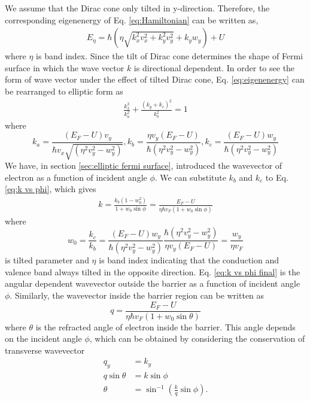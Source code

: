     We assume that the Dirac cone only tilted in y-direction. Therefore, the corresponding eigenenergy of Eq. \ref{eq:Hamiltonian} can be written as,
    \begin{align} \label{eq:eigenenergy}
        E_\eta=\hbar (\eta \sqrt{k_x^2 v_x^2+k_y^2 v_y^2 }+k_y w_y)+U
    \end{align}
    where $\eta$ is band index. Since the tilt of Dirac cone determines the shape of Fermi surface in which the wave vector $k$ is directional dependent. 
    In order to see the form of wave vector under the effect of tilted Dirac cone, Eq. \ref{eq:eigenenergy} can be rearranged to elliptic form as
    \begin{align}
        \frac{k_x^2}{k_a^2} + \frac{(k_y+k_c)^2}{k_b^2} = 1
    \end{align}
    where
    $$
    k_a = \frac{(E_F-U) v_y}{\hbar v_x \sqrt{(\eta^2 v_y^2 - w_y^2)} }, k_b = \frac{\eta v_y (E_F-U)}{\hbar (\eta^2 v_y^2 - w_y^2)},
    k_c = \frac{(E_F - U)w_y}{\hbar (\eta^2 v_y^2 - w_y^2)}
    $$
    We have, in section \ref{sec:elliptic fermi surface}, introduced the wavevector of electron as a function of incident angle $\phi$.
    We can substitute $k_b$ and $k_c$ to Eq. \ref{eq:k vs phi}, which gives
    \begin{align} \label{eq:k vs phi final}
        k = \frac{k_b(1-w_0^2)}{1+w_0 \sin{\phi}} = \frac{E_F - U}{\eta \hbar v_F (1+w_0 \sin{\phi})}
    \end{align}
    where
    \begin{equation} \label{3eq: tilted parameter}
        w_0 = \frac{k_c}{k_b} = \frac{(E_F - U)w_y}{\hbar (\eta^2 v_y^2 - w_y^2)} \frac{\hbar (\eta^2 v_y^2 - w_y^2)}{\eta v_y (E_F-U)} = \frac{w_y}{\eta v_F}
    \end{equation} 
    is tilted parameter and $\eta$ is band index indicating that the conduction and valence band always tilted in the opposite direction. 
    Eq. \ref{eq:k vs phi final} is the angular dependent wavevector outside the barrier as a function of incident angle $\phi$.
    Similarly, the wavevector inside the barrier region can be written as
    \begin{equation} \label{eq:q vs theta}
        q = \frac{E_F - U}{\eta \hbar v_F (1+w_0 \sin{\theta})}
    \end{equation}
    where $\theta$ is the refracted angle of electron inside the barrier. 
    This angle depends on the incident angle $\phi$, which can be obtained by considering the conservation of transverse wavevector
    \begin{equation} \label{eq:theta}
        \begin{aligned}
            q_y&=k_y\\
            q\sin{\theta} &= k \sin{\phi}\\
            \theta &= \sin^{-1}\left(\frac{k}{q}{\sin{\phi}}\right).\\
        \end{aligned}
    \end{equation}
